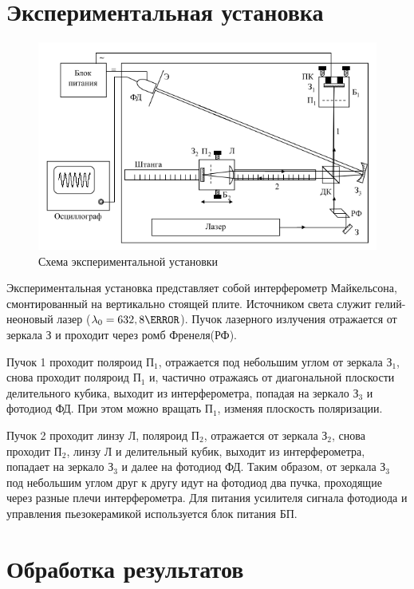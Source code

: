 \documentclass[a4paper,12pt]{article}
\begin{document}
\section{Экспериментальная установка}


\begin{figure}[h!]
	\begin{center}
		\includegraphics[scale = 0.5]{img2.png}
	\end{center}
	\caption{Схема экспериментальной установки}
\end{figure}


Экспериментальная установка представляет собой интерферометр Майкельсона, смонтированный на вертикально стоящей плите. Источником света служит гелий-неоновый лазер ($\lambda_{0} = 632,8 \nm$). Пучок лазерного излучения отражается от зеркала З и проходит через ромб Френеля(РФ).

Пучок 1 проходит поляроид $\text{П}_{1}$, отражается под небольшим углом от зеркала $\text{З}_1$, снова проходит поляроид $\text{П}_{1}$ и, частично отражаясь от диагональной плоскости делительного кубика, выходит из интерферометра, попадая на зеркало $\text{З}_3$ и фотодиод ФД. При этом можно вращать $\text{П}_{1}$, изменяя плоскость поляризации.

Пучок 2 проходит линзу Л, поляроид $\text{П}_2$, отражается от зеркала $\text{З}_2$, снова проходит $\text{П}_{2}$, линзу Л и делительный кубик, выходит из интерферометра, попадает на зеркало $\text{З}_3$ и далее на фотодиод ФД. Таким образом, от зеркала $\text{З}_3$ под небольшим углом друг к другу идут на фотодиод два пучка, проходящие через разные плечи интерферометра. Для питания усилителя сигнала фотодиода и управления пьезокерамикой используется блок питания БП.


\section{Обработка результатов}
\end{document}
